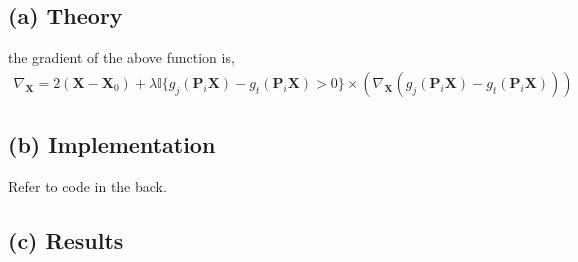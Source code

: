 \documentclass[11pt]{article}
\begin{document}
\subsection*{(a) Theory} the gradient of the above function is,
\begin{equation}
\begin{split}
\nabla_{\pmb{X}}=2(\pmb{X}-\pmb{X}_0)+\lambda\mathbb{I}\{g_j(\pmb{P}_i\pmb{X})-g_t(\pmb{P}_i\pmb{X})>0\}\times(\nabla_{\pmb{X}}(g_j(\pmb{P}_i\pmb{X})-g_t(\pmb{P}_i\pmb{X})))
\end{split}
\end{equation} 
\subsection*{(b) Implementation}
Refer to code in the back.
\subsection*{(c) Results}
\end{document}
